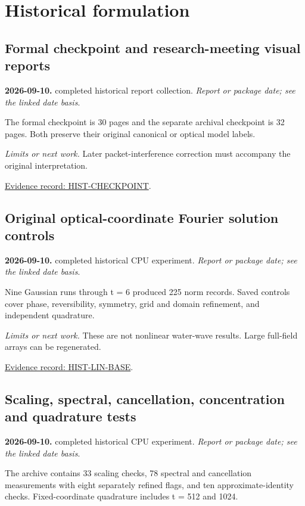 \documentclass[11pt]{article}
\begin{document}
\section{Historical formulation}
\subsection*{Formal checkpoint and research-meeting visual reports}
\noindent\textbf{2026-09-10.} completed historical report collection. \emph{Report or package date; see the linked date basis}.\par
The formal checkpoint is 30 pages and the separate archival checkpoint is 32 pages. Both preserve their original canonical or optical model labels.

\noindent\textit{Limits or next work.} Later packet-interference correction must accompany the original interpretation.

\noindent\href{https://github.com/matasvai/dysthe-paper/blob/codex/research-record-2026-11-05/research-record/2026-11-05/README.md#hist-checkpoint}{Evidence record: HIST-CHECKPOINT}.
\subsection*{Original optical-coordinate Fourier solution controls}
\noindent\textbf{2026-09-10.} completed historical CPU experiment. \emph{Report or package date; see the linked date basis}.\par
Nine Gaussian runs through t = 6 produced 225 norm records. Saved controls cover phase, reversibility, symmetry, grid and domain refinement, and independent quadrature.

\noindent\textit{Limits or next work.} These are not nonlinear water-wave results. Large full-field arrays can be regenerated.

\noindent\href{https://github.com/matasvai/dysthe-paper/blob/codex/research-record-2026-11-05/research-record/2026-11-05/README.md#hist-lin-base}{Evidence record: HIST-LIN-BASE}.
\subsection*{Scaling, spectral, cancellation, concentration and quadrature tests}
\noindent\textbf{2026-09-10.} completed historical CPU experiment. \emph{Report or package date; see the linked date basis}.\par
The archive contains 33 scaling checks, 78 spectral and cancellation measurements with eight separately refined flags, and ten approximate-identity checks. Fixed-coordinate quadrature includes t = 512 and 1024.
\end{document}
